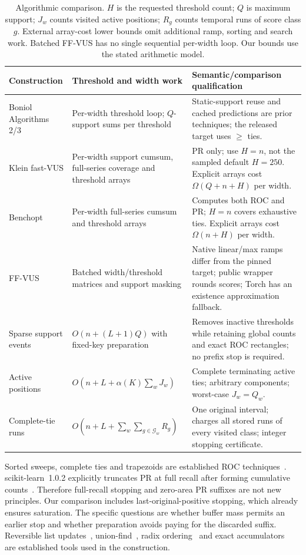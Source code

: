 \begin{table}[t]
\centering\small
\setlength{\tabcolsep}{4pt}
\begin{tabular}{p{}p{}p{}}
\toprule
Construction & Threshold and width work & Semantic/comparison qualification\\
\midrule
Boniol Algorithms 2/3 & Per-width threshold loop; $Q$-support sums per threshold & Static-support reuse and cached predictions are prior techniques; the released target uses $\ge$ ties.\\
Klein fast-VUS & Per-width support cumsum, full-series coverage and threshold arrays & PR only; use $H=n$, not the sampled default $H=250$. Explicit arrays cost $\Omega(Q+n+H)$ per width.\\
Benchopt & Per-width full-series cumsum and threshold arrays & Computes both ROC and PR; $H=n$ covers exhaustive ties. Explicit arrays cost $\Omega(n+H)$ per width.\\
FF-VUS & Batched width/threshold matrices and support masking & Native linear/max ramps differ from the pinned target; public wrapper rounds scores; Torch has an existence approximation fallback.\\
Sparse support events & $O(n+(L+1)Q)$ with fixed-key preparation & Removes inactive thresholds while retaining global counts and exact ROC rectangles; no prefix stop is required.\\
Active positions & $O(n+L+\alpha(K)\sum_wJ_w)$ & Complete terminating active ties; arbitrary components; worst-case $J_w=Q_w$.\\
Complete-tie runs & $O(n+L+\sum_w\sum_{g\in\mathcal G_w}R_g)$ & One original interval; charges all stored runs of every visited class; integer stopping certificate.\\
\bottomrule
\end{tabular}
\caption{Algorithmic comparison. $H$ is the requested threshold count;
$Q$ is maximum support; $J_w$ counts visited active positions; $R_g$ counts
temporal runs of score class $g$. External array-cost lower bounds omit
additional ramp, sorting and search work. Batched FF-VUS has no single
sequential per-width loop. Our bounds use the stated arithmetic model.}
\label{tab:algorithm-scope}
\end{table}

Sorted sweeps, complete ties and trapezoids are established ROC
techniques~\cite{fawcett2006}. scikit-learn~1.0.2 explicitly truncates PR at
full recall after forming cumulative counts~\cite{sklearn102}. Therefore
full-recall stopping and zero-area PR suffixes are not new principles.
Our comparison includes last-original-positive stopping, which already
ensures saturation. The specific questions are whether buffer mass permits
an earlier stop and whether preparation avoids paying for the discarded
suffix. Reversible list updates~\cite{knuth2000}, union-find~\cite{tarjan1984},
radix ordering~\cite{demaine2011radix,herf2001radix} and exact
accumulators~\cite{neal2015} are established tools used in the construction.

